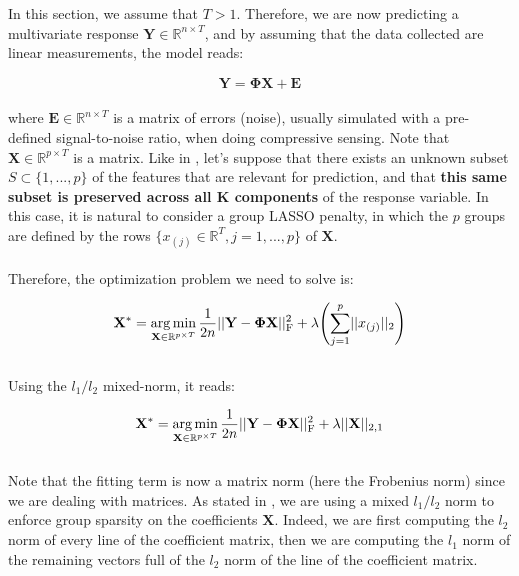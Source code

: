\documentclass[a4paper,10pt]{article}
\theoremstyle{definition}
\begin{document}
In this section, we assume that $T > 1$. Therefore, we are now predicting a multivariate response $\mathbf{Y}\in \mathbb{R}^{n \times T}$, and by assuming that the data collected are linear measurements, the model reads:

\begin{equation*}
    \mathbf{Y} = \mathbf{\Phi}\mathbf{X} + \mathbf{E}
\end{equation*}
\\
where $\mathbf{E} \in \mathbb{R}^{n \times T}$ is a matrix of errors (noise), usually simulated with a pre-defined signal-to-noise ratio, when doing compressive sensing. Note that $\mathbf{X} \in \mathbb{R}^{p \times T}$ is a matrix.
Like in , let's suppose that there exists an unknown subset $S \subset  \{1, ..., p\}$ of the features that are relevant for prediction, and that \textbf{this same subset is preserved across all K components} of the response
variable. In this case, it is natural to consider a group LASSO penalty, in which the $p$ groups are defined by the rows $\{x_{(j)} \in \mathbb{R}^T, j=1,...,p\}$ of $\mathbf{X}$.
\\
\\
Therefore, the optimization problem we need to solve is:

\begin{equation*}
    \mathbf{X}^* = \operatorname*{arg\,min}_{\mathbf{X} \in \mathbb{R}^{p \times T}} \frac{1}{2n} \lvert\lvert \mathbf{Y} - \mathbf{\Phi X} \rvert\rvert_{\text{F}}^2 + \lambda \Biggl( \sum_{j=1}^p \lvert\lvert x_{(j)} \rvert\rvert_2 \Biggr)
\end{equation*}
\\
Using the $l_1/l_2$ mixed-norm, it reads:

\begin{equation*}
    \mathbf{X}^* = \operatorname*{arg\,min}_{\mathbf{X} \in \mathbb{R}^{p \times T}} \frac{1}{2n} \lvert\lvert \mathbf{Y} - \mathbf{\Phi X} \rvert\rvert_{\text{F}}^2 + \lambda \lvert\lvert \mathbf{X} \rvert\rvert_{2, 1}
\end{equation*}
\\
Note that the fitting term is now a matrix norm (here the Frobenius norm) since we are dealing with matrices. As stated in , we are using a mixed $l_1/l_2$ norm to enforce group sparsity on the coefficients $\mathbf{X}$. Indeed,
we are first computing the $l_2$ norm of every line of the coefficient matrix, then we are computing the $l_1$ norm of the remaining vectors full of the $l_2$ norm of the line of the coefficient matrix.
\end{document}
